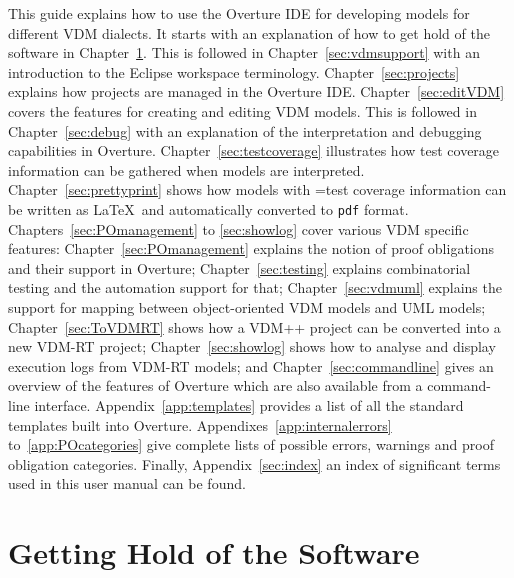 \documentclass{overturerepchap}
\begin{document}
This guide explains how to use the Overture IDE for developing models
for different VDM dialects. It starts with an explanation
of how to get hold of the software in
Chapter~\ref{sec:install}. This is followed in
Chapter~\ref{sec:vdmsupport} with an introduction to the Eclipse
workspace terminology. Chapter~\ref{sec:projects} explains how
projects are managed in the Overture IDE. Chapter~\ref{sec:editVDM}
covers the features for creating and editing VDM models. This is
followed in Chapter~\ref{sec:debug} with an explanation of the
interpretation and debugging capabilities in Overture.
Chapter~\ref{sec:testcoverage} illustrates how test coverage
information can be gathered when models are interpreted.
Chapter~\ref{sec:prettyprint} shows how models with =test
coverage information can be written as
\LaTeX\ and automatically converted to \texttt{pdf} format. 
Chapters~\ref{sec:POmanagement} to \ref{sec:showlog} cover various
VDM specific features: Chapter~\ref{sec:POmanagement}
explains the notion of proof obligations and their support in
Overture; Chapter~\ref{sec:testing} explains
combinatorial testing and the automation support for that;
Chapter~\ref{sec:vdmuml} explains the support for mapping between
object-oriented VDM models and UML models; Chapter~\ref{sec:ToVDMRT}
shows how a VDM++ project can be 
converted into a new VDM-RT project; Chapter~\ref{sec:showlog} shows
how to analyse and display execution logs from VDM-RT models; and
Chapter~\ref{sec:commandline} gives an
overview of the features of Overture which are also available from
a command-line interface. Appendix~\ref{app:templates} provides a list
of all the standard templates built into Overture. 
Appendixes~\ref{app:internalerrors}
to~\ref{app:POcategories} give complete lists of possible errors,
warnings and proof obligation categories.
Finally, Appendix~\ref{sec:index} an index of significant terms used in this
user manual can be found. 


\chapter{Getting Hold of the Software}\label{sec:install}
\end{document}
